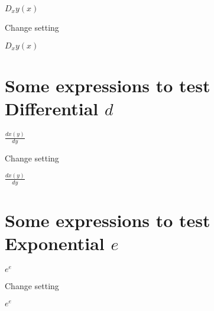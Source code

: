 \documentclass{article}
\begin{document}
$D_{x}y(x)$

Change setting

$D_{x}y\left( x\right) $

\section{Some expressions to test Differential $d$}

$\frac{dx(y)}{dy}$

Change setting

$\frac{dx\left( y\right) }{dy}$

\section{Some expressions to test Exponential $e$}

$e^{e}$

Change setting

$e^{e}$
\end{document}
